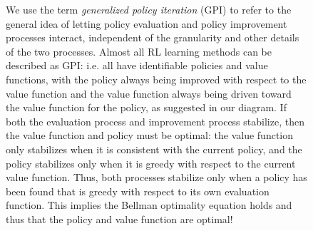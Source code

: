 \documentclass[12pt]{article}
\begin{document}
\begin{figure}[h]
  \centering
  \caption{\footnotesize We use the term \emph{generalized policy iteration} (GPI) to refer to the general idea of letting policy evaluation and policy improvement processes interact, independent of the granularity and other details of the two processes. Almost all RL learning methods can be described as GPI: i.e. all have identifiable policies and value functions, with the policy always being improved with respect to the value function and the value function always being driven toward the value function for the policy, as suggested in our diagram. If both the evaluation process and improvement process stabilize, then the value function and policy must be optimal: the value function only stabilizes when it is consistent with the current policy, and the policy stabilizes only when it is greedy with respect to the current value function. Thus, both processes stabilize only when a policy has been found that is greedy with respect to its own evaluation function. This implies the Bellman optimality equation holds and thus that the policy and value function are optimal!}
\end{figure}
\end{document}
